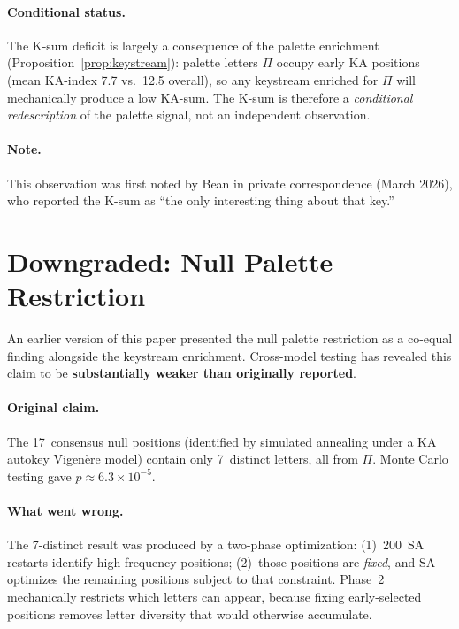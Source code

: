 \documentclass[11pt]{article}
\theoremstyle{remark}
\begin{document}
\paragraph{Conditional status.}
The K-sum deficit is largely a consequence of the palette enrichment
(Proposition~\ref{prop:keystream}): palette letters $\Pi$ occupy
early KA positions (mean KA-index 7.7 vs.\ 12.5 overall), so any
keystream enriched for $\Pi$ will mechanically produce a low KA-sum.
The K-sum is therefore a \emph{conditional redescription} of the
palette signal, not an independent observation.

\paragraph{Note.}
This observation was first noted by Bean in private correspondence
(March 2026), who reported the K-sum as ``the only interesting
thing about that key.''

\section{Downgraded: Null Palette Restriction}\label{sec:downgrade}

An earlier version of this paper presented the null palette
restriction as a co-equal finding alongside the keystream enrichment.
Cross-model testing has revealed this claim to be \textbf{substantially
weaker than originally reported}.

\paragraph{Original claim.}
The 17~consensus null positions (identified by simulated annealing
under a KA autokey Vigen\`ere model) contain only 7~distinct letters,
all from $\Pi$.  Monte Carlo testing gave $p \approx 6.3 \times 10^{-5}$.

\paragraph{What went wrong.}
The 7-distinct result was produced by a two-phase optimization:
(1)~200~SA restarts identify high-frequency positions;
(2)~those positions are \emph{fixed}, and SA optimizes the remaining
positions subject to that constraint.  Phase~2 mechanically restricts
which letters can appear, because fixing early-selected positions
removes letter diversity that would otherwise accumulate.
\end{document}
